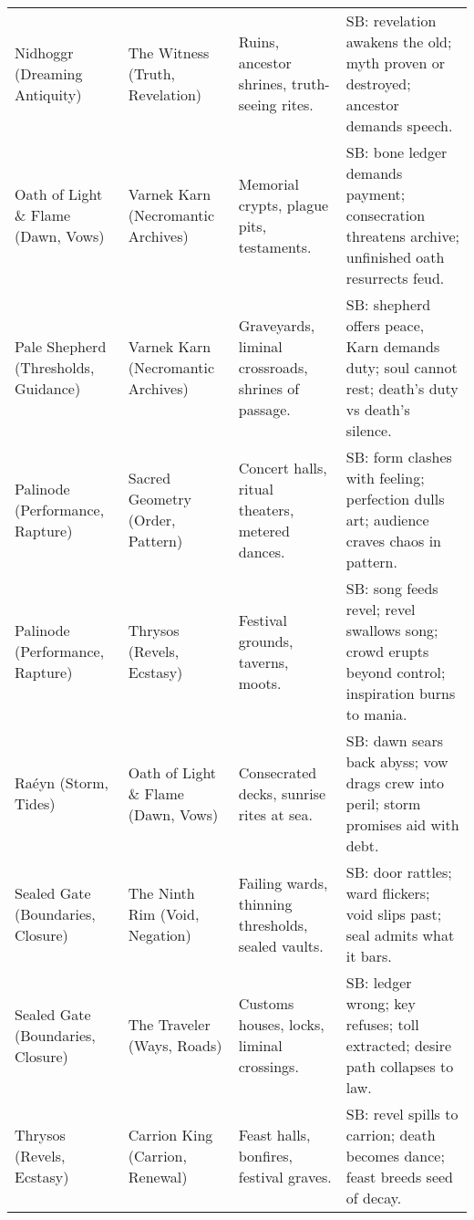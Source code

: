 \begin{longtable}{@{}p{3.3cm}p{3.3cm}p{4.6cm}p{7.2cm}@{}}
  Nidhoggr (Dreaming Antiquity) & The Witness (Truth, Revelation) &
  Ruins, ancestor shrines, truth-seeing rites. &
  SB: revelation awakens the old; myth proven or destroyed; ancestor demands speech. \\

  Oath of Light \& Flame (Dawn, Vows) & Varnek Karn (Necromantic Archives) &
  Memorial crypts, plague pits, testaments. &
  SB: bone ledger demands payment; consecration threatens archive; unfinished oath resurrects feud. \\

  Pale Shepherd (Thresholds, Guidance) & Varnek Karn (Necromantic Archives) &
  Graveyards, liminal crossroads, shrines of passage. &
  SB: shepherd offers peace, Karn demands duty; soul cannot rest; death's duty vs death's silence. \\

  Palinode (Performance, Rapture) & Sacred Geometry (Order, Pattern) &
  Concert halls, ritual theaters, metered dances. &
  SB: form clashes with feeling; perfection dulls art; audience craves chaos in pattern. \\

  Palinode (Performance, Rapture) & Thrysos (Revels, Ecstasy) &
  Festival grounds, taverns, moots. &
  SB: song feeds revel; revel swallows song; crowd erupts beyond control; inspiration burns to mania. \\

  Raéyn (Storm, Tides) & Oath of Light \& Flame (Dawn, Vows) &
  Consecrated decks, sunrise rites at sea. &
  SB: dawn sears back abyss; vow drags crew into peril; storm promises aid with debt. \\

  Sealed Gate (Boundaries, Closure) & The Ninth Rim (Void, Negation) &
  Failing wards, thinning thresholds, sealed vaults. &
  SB: door rattles; ward flickers; void slips past; seal admits what it bars. \\

  Sealed Gate (Boundaries, Closure) & The Traveler (Ways, Roads) &
  Customs houses, locks, liminal crossings. &
  SB: ledger wrong; key refuses; toll extracted; desire path collapses to law. \\

  Thrysos (Revels, Ecstasy) & Carrion King (Carrion, Renewal) &
  Feast halls, bonfires, festival graves. &
  SB: revel spills to carrion; death becomes dance; feast breeds seed of decay. \\


\end{longtable}
